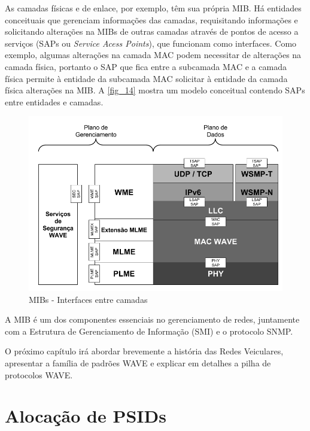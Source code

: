 \documentclass[
12pt,				%
openright,			%
oneside,			%
a4paper,			%
brazil,				%
]{abntex2}
\begin{document}
{\begin{anexosenv}
	\par As camadas físicas e de enlace, por exemplo, têm sua própria MIB. Há entidades conceituais que gerenciam informações das camadas, requisitando informações e solicitando alterações na MIBs de outras camadas através de pontos de acesso a serviços (SAPs ou \textit{Service Acess Points}), que funcionam como interfaces. Como exemplo, algumas alterações na camada MAC podem necessitar de alterações na camada física, portanto o SAP que fica entre a subcamada MAC e a camada física permite à entidade da subcamada MAC solicitar à entidade da camada física alterações na MIB. A \autoref{fig_14} mostra um modelo conceitual contendo SAPs entre entidades e camadas.
	
	\begin{figure} [H]
		\centering
		\includegraphics[scale=.5]{figuras/cap2/14MIBsInterfacesentrecamadas}
		\caption{\label{fig_14} MIBs - Interfaces entre camadas}
	\end{figure}
	
	\par A MIB é um dos componentes essenciais no gerenciamento de redes, juntamente com a Estrutura de Gerenciamento de Informação (SMI) e o protocolo SNMP.
	
	\par O próximo capítulo irá abordar brevemente a história das Redes Veiculares, apresentar a família de padrões WAVE e explicar em detalhes a pilha de protocolos WAVE.





		\chapter{Alocação de PSIDs}
		

\end{anexosenv}}
\end{document}
